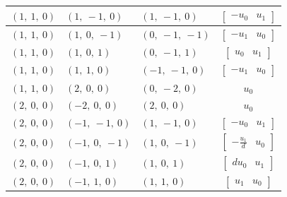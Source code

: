 \documentclass[11pt]{article}
\theoremstyle{definition}
\begin{document}
\begin{longtable}{|l|l|l|c|}
    \hline
    $\left( 1, \  1, \  0\right)$ & $\left( 1, \  -1, \  0\right)$ & $\left( 1, \  -1, \  0\right)$ & $\left[\begin{matrix}- u_{0} & u_{1}\end{matrix}\right]$ \\
    \hline
    $\left( 1, \  1, \  0\right)$ & $\left( 1, \  0, \  -1\right)$ & $\left( 0, \  -1, \  -1\right)$ & $\left[\begin{matrix}- u_{1} & u_{0}\end{matrix}\right]$ \\
    \hline
    $\left( 1, \  1, \  0\right)$ & $\left( 1, \  0, \  1\right)$ & $\left( 0, \  -1, \  1\right)$ & $\left[\begin{matrix}u_{0} & u_{1}\end{matrix}\right]$ \\
    \hline
    $\left( 1, \  1, \  0\right)$ & $\left( 1, \  1, \  0\right)$ & $\left( -1, \  -1, \  0\right)$ & $\left[\begin{matrix}- u_{1} & u_{0}\end{matrix}\right]$ \\
    \hline
    $\left( 1, \  1, \  0\right)$ & $\left( 2, \  0, \  0\right)$ & $\left( 0, \  -2, \  0\right)$ & $u_{0}$ \\
    \hline
    $\left( 2, \  0, \  0\right)$ & $\left( -2, \  0, \  0\right)$ & $\left( 2, \  0, \  0\right)$ & $u_{0}$ \\
    \hline
    $\left( 2, \  0, \  0\right)$ & $\left( -1, \  -1, \  0\right)$ & $\left( 1, \  -1, \  0\right)$ & $\left[\begin{matrix}- u_{0} & u_{1}\end{matrix}\right]$ \\
    \hline
    $\left( 2, \  0, \  0\right)$ & $\left( -1, \  0, \  -1\right)$ & $\left( 1, \  0, \  -1\right)$ & $\left[\begin{matrix}- \frac{u_{1}}{d} & u_{0}\end{matrix}\right]$ \\
    \hline
    $\left( 2, \  0, \  0\right)$ & $\left( -1, \  0, \  1\right)$ & $\left( 1, \  0, \  1\right)$ & $\left[\begin{matrix}d u_{0} & u_{1}\end{matrix}\right]$ \\
    \hline
    $\left( 2, \  0, \  0\right)$ & $\left( -1, \  1, \  0\right)$ & $\left( 1, \  1, \  0\right)$ & $\left[\begin{matrix}u_{1} & u_{0}\end{matrix}\right]$ \\

\end{longtable}
\end{document}
